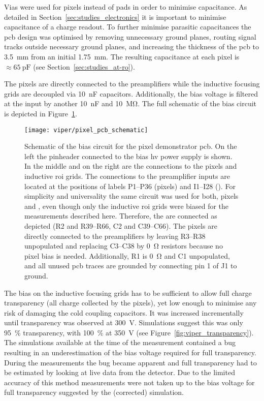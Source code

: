 Vias were used for pixels instead of pads in order to minimise capacitance.
As detailed in Section~\ref{sec:studies_electronics} it is important to minimise capacitance of a charge readout.
To further minimise parasitic capacitances the \gls{pcb} design was optimised by removing unnecessary ground planes, routing signal tracks outside necessary ground planes, and increasing the thickness of the \gls{pcb} to \SI{3.5}{\milli\metre} from an initial \SI{1.75}{\milli\metre}. 
The resulting capacitance at each pixel is $\approx \SI{65}{\pico\farad}$ (see Section~\ref{sec:studies_at-ro}).

The pixels are directly connected to the preamplifiers while the inductive focusing grids are decoupled via \SI{10}{\nano\farad} capacitors.
Additionally, the bias voltage is filtered at the input by another \SI{10}{\nano\farad} and \SI{10}{\mega\ohm}.
The full schematic of the bias circuit is depicted in Figure~\ref{fig:viper_pcb_schematic}.

\begin{figure}[htb]
	\centering
	\texttt{[image: viper/pixel\_pcb\_schematic]}
	\caption[Pixel demonstrator bias circuit]{%
		Schematic of the bias circuit for the \AC{} pixel demonstrator \acrshort{pcb}.
		On the left the pinheader connected to the bias \acrshort{hv} power supply is shown. In the middle and on the right are the connections to the pixels and inductive \acrshort{roi} grids.
		The connections to the preamplifier inputs are located at the positions of labels P1--P36 (pixels) and I1--I28 ().
		For simplicity and universality the same circuit was used for both, pixels and , even though only the inductive \acrshort{roi} grids were biased for the measurements described here.
		Therefore, the  are connected as depicted (R2 and R39--R66, C2 and C39--C66).
		The pixels are directly connected to the preamplifiers by leaving R3--R38 unpopulated and replacing C3--C38 by \SI{0}{\ohm} resistors because no pixel bias is needed.
		Additionally, R1 is \SI{0}{\ohm} and C1 unpopulated, and all unused \acrshort{pcb} traces are grounded by connecting pin 1 of J1 to ground.
	}
	\label{fig:viper_pcb_schematic}
\end{figure}

The bias on the inductive focusing grids has to be sufficient to allow full charge transparency (all charge collected by the pixels), yet low enough to minimise any risk of damaging the cold coupling capacitors.
It was increased incrementally until transparency was observed at \SI{300}{\volt}. 
Simulations suggest this was only \SI{95}{\percent} transparency, with \SI{100}{\percent} at \SI{350}{\volt} (see Figure~\ref{fig:viper_transparency}).
The simulations available at the time of the measurement contained a bug resulting in an underestimation of the bias voltage required for full transparency.
During the measurements the bug became apparent and full transparency had to be estimated by looking at live data from the detector.
Due to the limited accuracy of this method measurements were not taken up to the bias voltage for full transparency suggested by the (corrected) simulation.~\cite{francypants}

